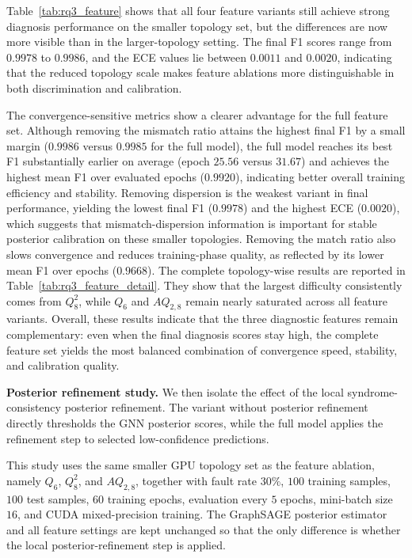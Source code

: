 Table~\ref{tab:rq3_feature} shows that all four feature variants still achieve strong diagnosis performance on the smaller topology set, but the differences are now more visible than in the larger-topology setting. The final F1 scores range from $0.9978$ to $0.9986$, and the ECE values lie between $0.0011$ and $0.0020$, indicating that the reduced topology scale makes feature ablations more distinguishable in both discrimination and calibration.

The convergence-sensitive metrics show a clearer advantage for the full feature set. Although removing the mismatch ratio attains the highest final F1 by a small margin ($0.9986$ versus $0.9985$ for the full model), the full model reaches its best F1 substantially earlier on average (epoch $25.56$ versus $31.67$) and achieves the highest mean F1 over evaluated epochs ($0.9920$), indicating better overall training efficiency and stability. Removing dispersion is the weakest variant in final performance, yielding the lowest final F1 ($0.9978$) and the highest ECE ($0.0020$), which suggests that mismatch-dispersion information is important for stable posterior calibration on these smaller topologies. Removing the match ratio also slows convergence and reduces training-phase quality, as reflected by its lower mean F1 over epochs ($0.9668$). The complete topology-wise results are reported in Table~\ref{tab:rq3_feature_detail}. They show that the largest difficulty consistently comes from $Q_8^2$, while $Q_6$ and $AQ_{2,8}$ remain nearly saturated across all feature variants. Overall, these results indicate that the three diagnostic features remain complementary: even when the final diagnosis scores stay high, the complete feature set yields the most balanced combination of convergence speed, stability, and calibration quality.

\noindent\textbf{Posterior refinement study.}
We then isolate the effect of the local syndrome-consistency posterior refinement. The variant without posterior refinement directly thresholds the GNN posterior scores, while the full model applies the refinement step to selected low-confidence predictions.

This study uses the same smaller GPU topology set as the feature ablation, namely $Q_6$, $Q_8^2$, and $AQ_{2,8}$, together with fault rate $30\%$, $100$ training samples, $100$ test samples, $60$ training epochs, evaluation every $5$ epochs, mini-batch size $16$, and CUDA mixed-precision training. The GraphSAGE posterior estimator and all feature settings are kept unchanged so that the only difference is whether the local posterior-refinement step is applied.

